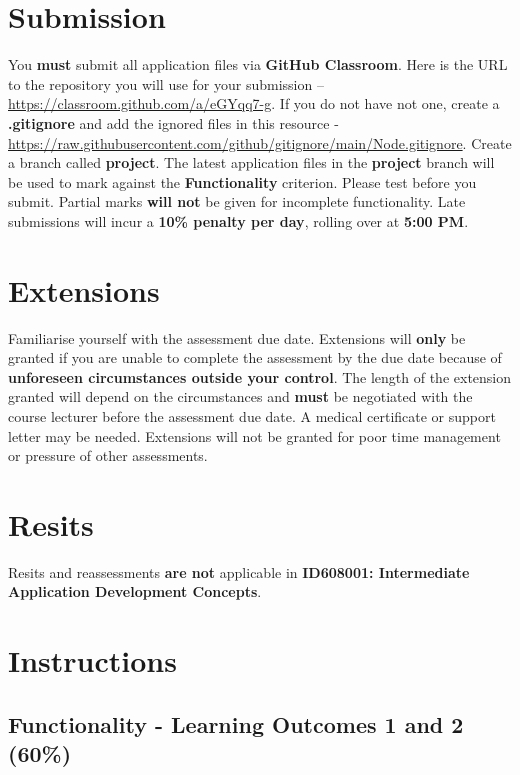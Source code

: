 \documentclass{article}
\begin{document}
\section*{Submission}
You \textbf{must} submit all application files via \textbf{GitHub Classroom}. Here is the URL to the repository you will use for your submission – \href{https://classroom.github.com/a/eGYqq7-g}{https://classroom.github.com/a/eGYqq7-g}. If you do not have not one, create a \textbf{.gitignore} and add the ignored files in this resource - \href{https://raw.githubusercontent.com/github/gitignore/main/Node.gitignore}{https://raw.githubusercontent.com/github/gitignore/main/Node.gitignore}. Create a branch called \textbf{project}. The latest application files in the \textbf{project} branch will be used to mark against the \textbf{Functionality} criterion. Please test before you submit. Partial marks \textbf{will not} be given for incomplete functionality. Late submissions will incur a \textbf{10\% penalty per day}, rolling over at \textbf{5:00 PM}.

\section*{Extensions}
Familiarise yourself with the assessment due date. Extensions will \textbf{only} be granted if you are unable to complete the assessment by the due date because of \textbf{unforeseen circumstances outside your control}. The length of the extension granted will depend on the circumstances and \textbf{must} be negotiated with the course lecturer before the assessment due date. A medical certificate or support letter may be needed. Extensions will not be granted for poor time management or pressure of other assessments.

\section*{Resits}
Resits and reassessments \textbf{are not} applicable in \textbf{ID608001: Intermediate Application Development Concepts}.

\section*{Instructions}

\subsection*{Functionality - Learning Outcomes 1 and 2 (60\%)}
\end{document}
